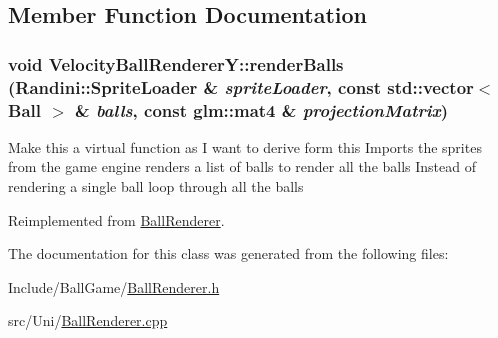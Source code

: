 \subsection{Member Function Documentation}
\hypertarget{classVelocityBallRendererY_aee5499c81382f071f58467d2040e36c9}{
\subsubsection[{renderBalls}]{\setlength{\rightskip}{0pt plus 5cm}void VelocityBallRendererY::renderBalls ({\bf Randini::SpriteLoader} \& {\em spriteLoader}, \/  const std::vector$<$ {\bf Ball} $>$ \& {\em balls}, \/  const glm::mat4 \& {\em projectionMatrix})}}
\label{classVelocityBallRendererY_aee5499c81382f071f58467d2040e36c9}
Make this a virtual function as I want to derive form this Imports the sprites from the game engine renders a list of balls to render all the balls Instead of rendering a single ball loop through all the balls 

Reimplemented from \hyperlink{classBallRenderer_a6169ba2a00e8d15fde87a3ee4552cf66}{BallRenderer}.

The documentation for this class was generated from the following files:\begin{DoxyCompactItemize}
\item 
Include/BallGame/\hyperlink{BallRenderer_8h}{BallRenderer.h}\item 
src/Uni/\hyperlink{BallRenderer_8cpp}{BallRenderer.cpp}\end{DoxyCompactItemize}

